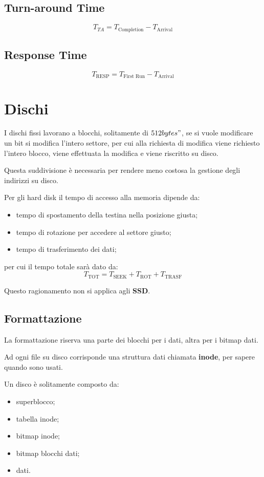 \subsection{Turn-around Time}
\[
  T_{TA}=T_{ \text{Completion}}-T_{ \text{Arrival}}
\]

\subsection{Response Time}
\[
  T_ { \text{RESP}}=T_{ \text{First Run}}-T_{ \text{Arrival}}
\]

\section{Dischi}
I dischi fissi lavorano a blocchi, solitamente di $512 bytes"$, se si vuole
modificare un bit si modifica l'intero settore, per cui alla richiesta di
modifica viene richiesto l'intero blocco, viene effettuata la modifica e viene
riscritto su disco.


Questa suddivisione è necessaria per rendere meno costosa la gestione degli
indirizzi su disco.

Per gli hard disk il tempo di accesso alla memoria dipende da:
\begin{itemize}
  \item tempo di spostamento della testina nella posizione giusta;
  \item tempo di rotazione per accedere al settore giusto;
  \item tempo di trasferimento dei dati;
\end{itemize}

per cui il tempo totale sarà dato da:
\[T_{\text{TOT}}=T_{\text{SEEK}}+T_{\text{ROT}}+T_{\text{TRASF}}\]

Questo ragionamento non si applica agli \textbf{SSD}.

\subsection{Formattazione}
La formattazione riserva una parte dei blocchi per i dati, altra per i bitmap
dati.

Ad ogni file su disco corrisponde una struttura dati chiamata \textbf{inode},
per sapere quando sono usati.

Un disco è solitamente composto da:
\begin{itemize}
  \item superblocco;
  \item tabella inode;
  \item bitmap inode;
  \item bitmap blocchi dati;
  \item dati.
\end{itemize}

